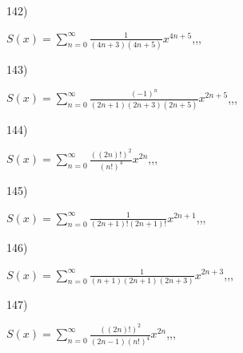 \documentclass[11pt, ukrainian]{article}
\begin{document}
\par
\vspace{0.9cm}
142) \space 
{%
{$S(x)=\sum\limits_{n=0}^{\infty}{\frac{1}{(4n+3)(4n+5)}}{x^{{4n+5}}}$},,, \par \smallskip  
}
\par
\vspace{0.9cm}
143) \space 
{%
{$S(x)=\sum\limits_{n=0}^{\infty}{\frac{(-1)^n}{(2n+1)(2n+3)(2n+5)}}{x^{{2n+5}}}$},,, \par \smallskip  
}
\par
\vspace{0.9cm}
144) \space 
{%
{$S(x)=\sum\limits_{n=0}^{\infty}{\frac{((2n)!)^2}{(n!)^4}}{x^{{2n}}}$},,, \par \smallskip  
}
\par
\vspace{0.9cm}
145) \space 
{%
{$S(x)=\sum\limits_{n=0}^{\infty}{\frac{1}{(2n+1)!(2n+1)!}}{x^{{2n+1}}}$},,, \par \smallskip  
}
\par
\vspace{0.9cm}
146) \space 
{%
{$S(x)=\sum\limits_{n=0}^{\infty}{\frac{1}{(n+1)(2n+1)(2n+3)}}{x^{{2n+3}}}$},,, \par \smallskip  
}
\par
\vspace{0.9cm}
147) \space 
{%
{$S(x)=\sum\limits_{n=0}^{\infty}{\frac{((2n)!)^2}{(2n-1)(n!)^4}}{x^{{2n}}}$},,, \par \smallskip  
}
\end{document}
